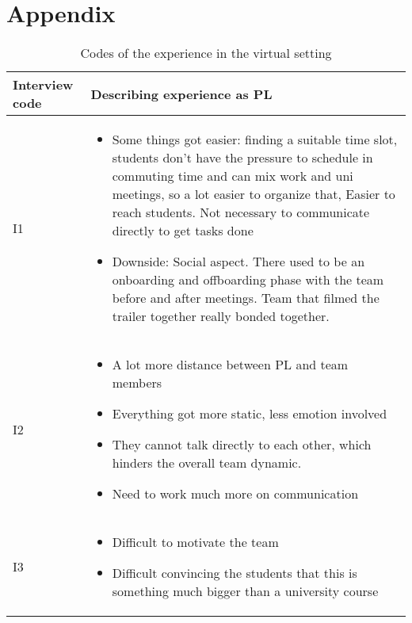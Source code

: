 \chapter{Appendix} \label{Appendix}

\begin{longtable}{|  p{}  |  p{} |}
\caption{Codes of the experience in the virtual setting}
\label{tab:table3}\\
\hline
\textbf{Interview code} & \textbf{Describing experience as PL} \\
\hline
\vspace{-0.5cm} I1 & 
   \begin{itemize}
    \vspace{-0.5cm} \item Some things got easier: finding a suitable time slot, students don't have the pressure to schedule in commuting time and can mix work and uni meetings, so a lot easier to organize that, Easier to reach students. Not necessary to communicate directly to get tasks done
    \vspace{-0.3cm} \item Downside: Social aspect. There used to be an onboarding and offboarding phase with the team before and after meetings. Team that filmed the trailer together really bonded together.
    \end{itemize} \\
\hline
\vspace{-0.5cm} I2 &
    \begin{itemize}
   \vspace{-0.5cm}  \item A lot more distance between PL and team members
    \vspace{-0.3cm} \item Everything got more static, less emotion involved
    \vspace{-0.3cm} \item They cannot talk directly to each other, which hinders the overall team dynamic.
    \vspace{-0.3cm} \item Need to work much more on communication
    \end{itemize}\\
\hline
\vspace{-0.5cm} I3 & 
    \begin{itemize}
   \vspace{-0.5cm}  \item Difficult to motivate the team
    \vspace{-0.3cm} \item Difficult convincing the students that this is something much bigger than a university course

\end{itemize}
\end{longtable}
